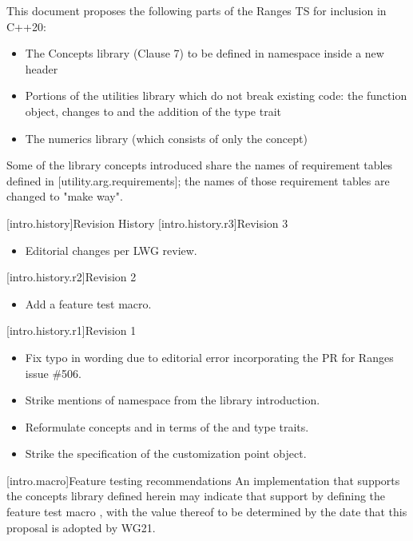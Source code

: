 This document proposes the following parts of the Ranges TS for inclusion in C++20:
\begin{itemize}
\item The Concepts library (Clause 7) to be defined in namespace  inside
  a new  header
\item Portions of the utilities library which do not break existing code: the
   function object, changes to   and the
  addition of the  type trait
\item The numerics library (which consists of only the
   concept)
\end{itemize}
Some of the library concepts introduced share the names of requirement tables
defined in [utility.arg.requirements]; the names of those requirement tables are
changed to "make way".

[intro.history]{Revision History}
[intro.history.r3]{Revision 3}
\begin{itemize}
\item Editorial changes per LWG review.
\end{itemize}

[intro.history.r2]{Revision 2}
\begin{itemize}
\item Add a feature test macro.
\end{itemize}

[intro.history.r1]{Revision 1}
\begin{itemize}
\item Fix typo in  wording due to editorial error
  incorporating the PR for Ranges issue \#506.
\item Strike mentions of namespace  from the library introduction.
\item Reformulate concepts  and  in terms
  of the  and  type traits.
\item Strike the specification of the  customization point object.
\end{itemize}

[intro.macro]{Feature testing recommendations}
An implementation that supports the concepts library defined herein may indicate
that support by defining the feature test macro , with
the value thereof to be determined by the date that this proposal is adopted by
WG21.

